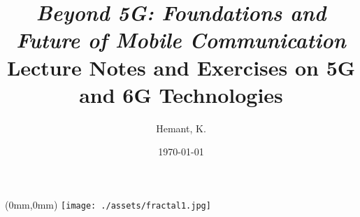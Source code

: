 \documentclass[12pt,oneside,openany]{report}
\title{\color{mrn} \Huge \bfseries  \emph{Beyond 5G: Foundations and Future of Mobile Communication} \\
\vspace{0.5em}
\Large Lecture Notes and Exercises on 5G and 6G Technologies}
\author{Hemant, K.}
\date{\today}
\begin{document}
\pagecolor{stardustbg}
\maketitle
\clearpage

\thispagestyle{empty}

\clearpage
\pagecolor{white}

\tableofcontents


\clearpage

\thispagestyle{empty}
\begin{textblock*}{297mm}(0mm,0mm)
     \texttt{[image: ./assets/fractal1.jpg]}
\end{textblock*}

\clearpage
\end{document}
